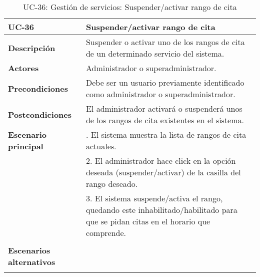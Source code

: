 \begin{table}[H]
  \begin{center}
    \begin{tabularx}{16.4cm}{|l|X|}
      \hline
      \textbf{UC-36} & \textbf{Suspender/activar rango de cita}\\
      \hline
      \textbf{Descripción} & Suspender o activar uno de los rangos de cita de un determinado servicio del sistema.\\
      \hline
      \textbf{Actores} & Administrador o superadministrador.\\
      \hline
      \textbf{Precondiciones} & Debe ser un usuario previamente identificado como administrador o superadministrador.\\
      \hline
      \textbf{Postcondiciones} & El administrador activará o suspenderá unos de los rangos de cita existentes en el sistema.\\
      \hline
      \textbf{Escenario principal} & \smallskip 1. El sistema muestra la lista de rangos de cita actuales.\\
      & 2. El administrador hace click en la opción deseada (suspender/activar) de la casilla del rango deseado.\\
      & 3. El sistema suspende/activa el rango, quedando este inhabilitado/habilitado para que se pidan citas en el horario que comprende.\\
      & \\
      \hline
      \textbf{Escenarios alternativos} & \smallskip \\
      & \\
      \hline
    \end{tabularx}
    \caption{UC-36: Gestión de servicios: Suspender/activar rango de cita}
  \end{center}
\end{table}


